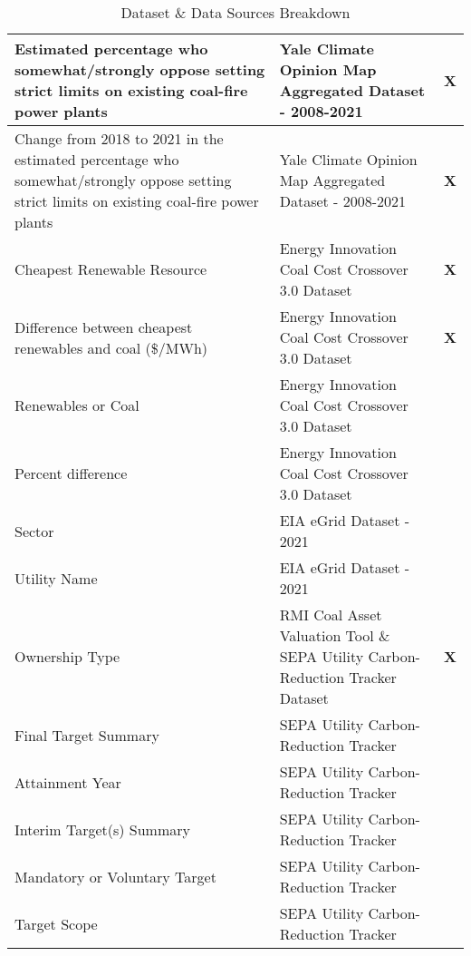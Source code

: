 \begin{table}[H]
\begin{adjustbox}{width=\textwidth}
\begin{tabular}{|l | l | l |}
        \midrule
        Estimated percentage who somewhat/strongly oppose setting strict limits on existing coal-fire power plants & Yale Climate Opinion Map Aggregated Dataset - 2008-2021 & \textbf{X} \\
        \midrule
        Change from 2018 to 2021 in the estimated percentage who somewhat/strongly oppose setting strict limits on existing coal-fire power plants & Yale Climate Opinion Map Aggregated Dataset - 2008-2021 & \textbf{X} \\
        \midrule
        Cheapest Renewable Resource & Energy Innovation Coal Cost Crossover 3.0 Dataset & \textbf{X} \\
        \midrule
        Difference between cheapest renewables and coal (\$/MWh) & Energy Innovation Coal Cost Crossover 3.0 Dataset & \textbf{X} \\
        \midrule
        Renewables or Coal & Energy Innovation Coal Cost Crossover 3.0 Dataset & \\
        \midrule
        Percent difference & Energy Innovation Coal Cost Crossover 3.0 Dataset & \\
        \midrule
        Sector & EIA eGrid Dataset - 2021 & \\
        \midrule
        Utility Name & EIA eGrid Dataset - 2021 & \ \\
        \midrule
        Ownership Type & RMI Coal Asset Valuation Tool \& SEPA Utility Carbon-Reduction Tracker Dataset & \textbf{X} \\
        \midrule
        Final Target Summary & SEPA Utility Carbon-Reduction Tracker & \\
        \midrule
        Attainment Year & SEPA Utility Carbon-Reduction Tracker & \\
        \midrule
        Interim Target(s) Summary & SEPA Utility Carbon-Reduction Tracker & \\
        \midrule
        Mandatory or Voluntary Target & SEPA Utility Carbon-Reduction Tracker & \\
        \midrule
        Target Scope & SEPA Utility Carbon-Reduction Tracker & \\
        \bottomrule
      \end{tabular}
    \end{adjustbox}
    \caption{Dataset \& Data Sources Breakdown}
  \end{table}




